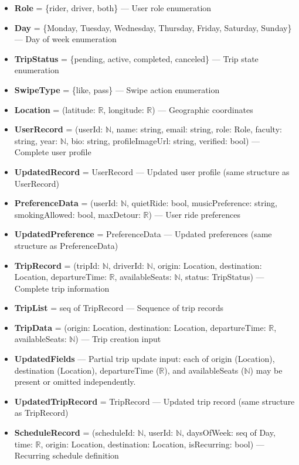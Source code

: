 \begin{itemize}
    \item \textbf{Role} = \{rider, driver, both\} --- User role enumeration
    \item \textbf{Day} = \{Monday, Tuesday, Wednesday, Thursday, Friday, Saturday, Sunday\} --- Day of week enumeration
    \item \textbf{TripStatus} = \{pending, active, completed, canceled\} --- Trip state enumeration
    \item \textbf{SwipeType} = \{like, pass\} --- Swipe action enumeration
    \item \textbf{Location} = (latitude: $\mathbb{R}$, longitude: $\mathbb{R}$) --- Geographic coordinates
    \item \textbf{UserRecord} = (userId: $\mathbb{N}$, name: string, email: string, role: Role, faculty: string, year: $\mathbb{N}$, bio: string, profileImageUrl: string, verified: bool) --- Complete user profile
    \item \textbf{UpdatedRecord} = UserRecord --- Updated user profile (same structure as UserRecord)
    \item \textbf{PreferenceData} = (userId: $\mathbb{N}$, quietRide: bool, musicPreference: string, smokingAllowed: bool, maxDetour: $\mathbb{R}$) --- User ride preferences
    \item \textbf{UpdatedPreference} = PreferenceData --- Updated preferences (same structure as PreferenceData)
    \item \textbf{TripRecord} = (tripId: $\mathbb{N}$, driverId: $\mathbb{N}$, origin: Location, destination: Location, departureTime: $\mathbb{R}$, availableSeats: $\mathbb{N}$, status: TripStatus) --- Complete trip information
    \item \textbf{TripList} = seq of TripRecord --- Sequence of trip records
    \item \textbf{TripData} = (origin: Location, destination: Location, departureTime: $\mathbb{R}$, availableSeats: $\mathbb{N}$) --- Trip creation input
    \item \textbf{UpdatedFields} --- Partial trip update input: each of origin (Location), destination (Location), departureTime ($\mathbb{R}$), and availableSeats ($\mathbb{N}$) may be present or omitted independently.
    \item \textbf{UpdatedTripRecord} = TripRecord --- Updated trip record (same structure as TripRecord)
    \item \textbf{ScheduleRecord} = (scheduleId: $\mathbb{N}$, userId: $\mathbb{N}$, daysOfWeek: seq of Day, time: $\mathbb{R}$, origin: Location, destination: Location, isRecurring: bool) --- Recurring schedule definition

\end{itemize}
